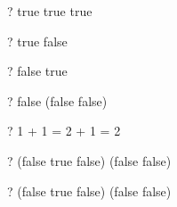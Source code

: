\begin{zed}
  \vdash? true \land true \land true
\end{zed}

\begin{zed}
  \vdash? true \lor false
\end{zed}

\begin{zed}
  \vdash? false \lor true
\end{zed}

\begin{zed}
  \vdash? false \lor (false \lor \lnot false)
\end{zed}

\begin{zed}
  \vdash? 1 + 1 = 2 \lor {} + 1 = 2
\end{zed}

\begin{zed}
  \vdash? (false \lor \lnot \lnot true \lor false) \lor
          (false \lor \lnot false)
\end{zed}

\begin{zed}
  \vdash? (false \lor \lnot \lnot true \lor false) \land
          (false \lor \lnot false)
\end{zed}
